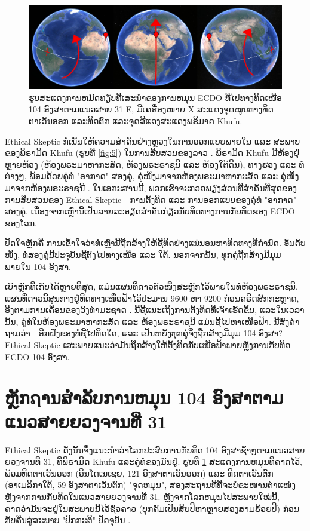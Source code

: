 \documentclass[10pt,twocolumn,letterpaper]{article}
\begin{document}
\begin{figure}[b]
\begin{center}
\includegraphics[width=1\textwidth]{drawing.jpg}
\end{center}
   \caption{ຮູບສະແດງການຫມົດທຽບທີ່ເສະນຳຂອງການຫມຸນ ECDO ທີ່ໄປທາງທິດເໜືອ 104 ອົງສາຕາມແນວສາຍ 31 E, ມີເຄຣື່ອງໝາຍ X ສະແດງຈຸດໝູນທາງທິດຕາເວັນອອກ ແລະທິດຕົກ ແລະຈຸດສີແດງສະແດງພຣິມາດ Khufu.}
\label{fig:6}
\end{figure}
Ethical Skeptic ກໍ່ເນັ້ນໃຫ້ຄວາມສຳຄັນຢ່າງຫຼວງໃນການອອກແບບພາຍໃນ ແລະ ສະພາບຂອງພິຣາມິດ Khufu (ຮູບທີ່ \ref{fig:5}) ໃນການສືບສວນຂອງລາວ \cite{28} . ພິຣາມິດ Khufu ມີຫ້ອງຢູ່ຫຼາຍຫ້ອງ (ຫ້ອງພຣະມາຫາກະສັດ, ຫ້ອງພຣະຣາຊນີ ແລະ ຫ້ອງໃຕ້ດິນ), ທາງຮອງ ແລະ ທໍ່ຕ່າງໆ, ພ້ອມດ້ວຍຄູ່ທໍ່ "ອາກາດ" ສອງຄູ່, ຄູ່ໜຶ່ງມາຈາກຫ້ອງພຣະມາຫາກະສັດ ແລະ ຄູ່ໜຶ່ງມາຈາກຫ້ອງພຣະຣາຊນີ \cite{29,30} . ໃນເອກະສານນີ້, ພວກເຮົາຈະກວດພຽງສ່ວນທີ່ສຳຄັນທີ່ສຸດຂອງການສືບສວນຂອງ Ethical Skeptic - ການຕັ້ງທິດ ແລະ ການອອກແບບຂອງຄູ່ທໍ່ "ອາກາດ" ສອງຄູ່, ເນື່ອງຈາກເຫຼົ່ານີ້ເປັນລາຍລະອຽດສຳຄັນກ່ຽວກັບທິດທາງການກັບທິດຂອງ ECDO ຂອງໂລກ.

ປັດໃຈຫຼັກຄື ການເຂົ້າໃຈວ່າທໍ່ເຫຼົ່ານີ້ຖືກສ້າງໃຫ້ຊີ້ທິດຢ່າງແນ່ນອນຫາທິດທາງທີ່ກຳນົດ. ອັນດັບໜຶ່ງ, ທໍ່ສອງຄູ່ນີ້ປະຈຸບັນຊີ້ຕົງໄປທາງເໜືອ ແລະ ໃຕ້. ນອກຈາກນັ້ນ, ທຸກຄູ່ຖືກສ້າງມີມຸມພາຍໃນ 104 ອົງສາ.

ເບົາຫຼັກທີ່ເກັບໄດ້ຫຼາຍທີ່ສຸດ, ແມ່ນແຜນທີ່ດາວຕົວໜຶ່ງສະຫຼັກໄວ້ພາຍໃນທໍ່ຫ້ອງພຣະຣາຊນີ. ແຜນທີ່ດາວນີ້ສູນກາງຢູ່ທິດທາງເໜືອຟ້າໄວ້ປະມານ 9600 ຫາ 9200 ກ່ອນຄຣິດສັກກະຫຼາດ, ອີງຕາມການເຄື່ອນຂອງວົງທຳມະຊາດ \cite{28} . ນີ້ຊີ້ແນະເຖິງການຕັ້ງທິດທີ່ເຈົາເຮັດຂຶ້ນ, ແລະໃນເວລານັ້ນ, ຄູ່ທໍ່ໃນຫ້ອງພຣະມາຫາກະສັດ ແລະ ຫ້ອງພຣະຣາຊນີ ແມ່ນຊີ້ໄປຫາເໜືອຟ້າ. ນີ້ສົ່ງຄຳຖາມວ່າ - ອີກຝັ່ງຂອງທໍ່ຊີ້ໄປທິດໃດ, ແລະ ເປັນຫຍັງທຸກຄູ່ຈຶ່ງຖືກສ້າງມີມຸມ 104 ອົງສາ? Ethical Skeptic ເສະພາຍແນະວ່າມັນຖືກສ້າງໃຫ້ຕັ້ງທິດກັບເໜືອຟ້າພາຍຫຼັງການກັບທິດ ECDO 104 ອົງສາ.

\section{ຫຼັກຐານສຳລັບການຫມຸນ 104 ອົງສາຕາມແນວສາຍຍວງຈານທີ່ 31}

Ethical Skeptic ດັ່ງນັ້ນຈຶ່ງແນະນຳວ່າໂລກປະສົບການກັບທິດ 104 ອົງສາຊ້ຳໆຕາມແນວສາຍຍວງຈານທີ່ 31, ທີ່ພິຣາມິດ Khufu ແລະຄູ່ທໍ່ຂອງມັນຢູ່. ຮູບທີ່ \ref{fig:6} ສະແດງການຫມຸນທີ່ຄາດໄວ້, ພ້ອມທິດຕາເວັນອອກ (ອິນໂດເນເຊຍ, 121 ອົງສາຕາເວັນອອກ) ແລະ ທິດຕາເວັນຕົກ (ອາເມລິກາໃຕ້, 59 ອົງສາຕາເວັນຕົກ) "ຈຸດຫມຸນ", ສອງສະຖານທີ່ທີ່ຈະບໍ່ຂະໜານຕຳແໜ່ງຫຼັງຈາກການກັບທິດໃນແນວສາຍຍວງຈານທີ່ 31. ຫຼັງຈາກໂລກຫມຸນໄປສະພາບໃໝ່ນີ້, ຄາດວ່າມັນຈະຢູ່ໃນສະພາບນີ້ໄວ້ຊົ່ວຄາວ (ບຸກຄົມເປັນສິບປີຫາຫຼາຍສອງສາມຮ້ອຍປີ) ກ່ອນກັບຄືນສູ່ສະພາບ "ປົກກະຕິ" ປັດຈຸບັນ \cite{150} .
\end{document}
